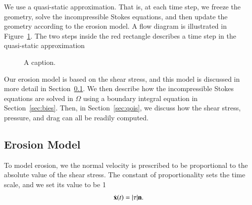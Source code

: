 \documentclass[preprint, 10pt]{elsarticle}
\begin{document}
We use a quasi-static approximation.  That is, at each time step, we
freeze the geometry, solve the incompressible Stokes equations, and then
update the geometry according to the erosion model.  A flow diagram is
illustrated in Figure~\ref{fig:workflow}.  The two steps inside the red
rectangle describes a time step in the quasi-static approximation
\begin{figure}[htpb]
  \centering
  
  \caption{\label{fig:workflow}A caption.}
\end{figure}

Our erosion model is based on the shear stress, and this model is
discussed in more detail in Section~\ref{sec:erosion}.  We then describe
how the incompressible Stokes equations are solved in $\Omega$ using a
boundary integral equation in Section~\ref{sec:bies}.  Then, in
Section~\ref{sec:qois}, we discuss how the shear stress, pressure, and
drag can all be readily computed.  


\subsection{Erosion Model} 
\label{sec:erosion}

To model erosion, we the normal velocity is prescribed to be
proportional to the absolute value of the shear stress.  The constant of
proportionality sets the time scale, and we set its value to be 1
\begin{align}
  \dot{{\mathbf{x}}}(t) = \lvert \tau \rvert {\mathbf{n}}.
  \label{eqn:bodyEvolution}
\end{align}

\cite{moo-ris-chi-zha-she2013}


\end{document}
